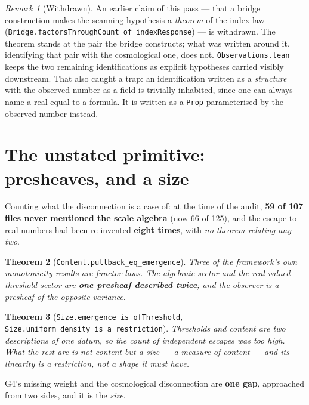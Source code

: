 \documentclass[11pt,a4paper]{article}
\newtheorem{theorem}{Theorem}[section]
\theoremstyle{definition}
\theoremstyle{remark}
\newtheorem{remark}[theorem]{Remark}
\newcommand{\lean}[1]{\texttt{\small #1}}
\begin{document}
\begin{remark}[Withdrawn]
An earlier claim of this pass --- that a bridge construction makes the scanning
hypothesis a \emph{theorem} of the index law
(\lean{Bridge.factorsThroughCount\_of\_indexResponse}) --- is withdrawn. The
theorem stands at the pair the bridge constructs; what was written around it,
identifying that pair with the cosmological one, does not.
\lean{Observations.lean} keeps the two remaining identifications as explicit
hypotheses carried visibly downstream. That also caught a trap: an identification
written as a \emph{structure} with the observed number as a field is trivially
inhabited, since one can always name a real equal to a formula. It is written as a
\lean{Prop} parameterised by the observed number instead.
\end{remark}

\section{The unstated primitive: presheaves, and a size}
\label{sec:content}

Counting what the disconnection is a case of: at the time of the audit,
\textbf{59 of 107 files never mentioned the scale algebra} (now 66 of 125), and
the escape to real numbers had been re-invented \textbf{eight times}, with
\emph{no theorem relating any two}.

\begin{theorem}[\lean{Content.pullback\_eq\_emergence}]
Three of the framework's own monotonicity results \emph{are} functor laws. The
algebraic sector and the real-valued threshold sector are \textbf{one presheaf
described twice}; and the observer is a presheaf of the opposite variance.
\end{theorem}

\begin{theorem}[\lean{Size.emergence\_is\_ofThreshold},
\lean{Size.uniform\_density\_is\_a\_restriction}]
Thresholds and content are two descriptions of one datum, so the count of
independent escapes was too high. What the rest are is not content but a
\emph{size} --- a measure of content --- and its linearity is a restriction, not a
shape it must have.
\end{theorem}

\begin{claimbox}
G4's missing weight and the cosmological disconnection are \textbf{one gap},
approached from two sides, and it is the \emph{size}.
\end{claimbox}
\end{document}
